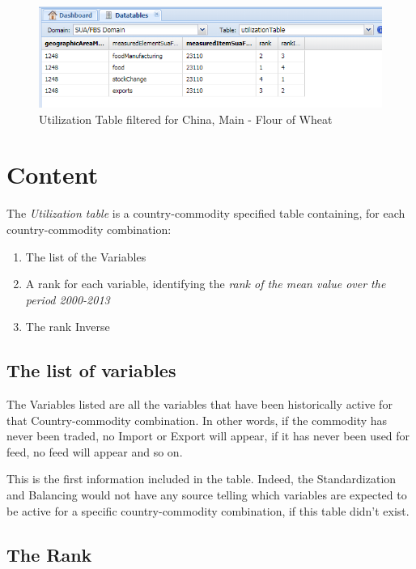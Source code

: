 \documentclass[]{article}
\providecommand{\tightlist}{%
  \setlength{\itemsep}{0pt}\setlength{\parskip}{0pt}}
\begin{document}
\begin{figure}[H]

{\centering \includegraphics[width=0.9\linewidth]{images/UtilizationTable/04_filter2} 

}

\caption{\label{fig:f4}Utilization Table  filtered for China, Main - Flour of Wheat}\label{fig:f4}
\end{figure}

\section{Content}\label{content}

The \emph{Utilization table} is a country-commodity specified table
containing, for each country-commodity combination:

\begin{enumerate}
\def\labelenumi{\arabic{enumi}.}
\tightlist
\item
  The list of the Variables
\item
  A rank for each variable, identifying the \emph{rank of the mean value
  over the period 2000-2013}
\item
  The rank Inverse
\end{enumerate}

\subsection{The list of variables}\label{the-list-of-variables}

The Variables listed are all the variables that have been historically
active for that Country-commodity combination. In other words, if the
commodity has never been traded, no Import or Export will appear, if it
has never been used for feed, no feed will appear and so on.

This is the first information included in the table. Indeed, the
Standardization and Balancing would not have any source telling which
variables are expected to be active for a specific country-commodity
combination, if this table didn't exist.

\subsection{The Rank}\label{the-rank}
\end{document}
